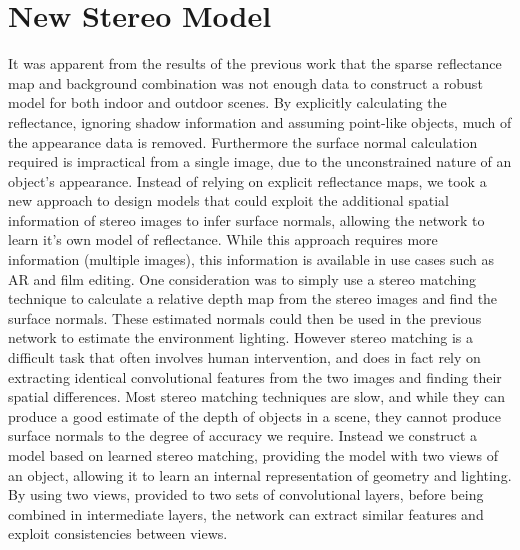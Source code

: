 \documentclass[ %
                    author={Gavin Parker},
                supervisor={Dr. Neill Campbell},
                    degree={MEng},
                     title={Deep Siamese Networks for Illumination Estimation from Stereo Images},
                  subtitle={},
                      type={research},
                      year={2018} ]{dissertation}
\begin{document}
\section{New Stereo Model}
It was apparent from the results of the previous work that the sparse reflectance map and background combination was not enough data to construct a robust model for both indoor and outdoor scenes. By explicitly calculating the reflectance, ignoring shadow information and assuming point-like objects, much of the appearance data is removed. Furthermore the surface normal calculation required is impractical from a single image, due to the unconstrained nature of an object's appearance. Instead of relying on explicit reflectance maps, we took a new approach to design models that could exploit the additional spatial information of stereo images to infer surface normals, allowing the network to learn it's own model of reflectance. While this approach requires more information (multiple images), this information is available in use cases such as AR and film editing. One consideration was to simply use a stereo matching technique to calculate a relative depth map from the stereo images and find the surface normals. These estimated normals could then be used in the previous network to estimate the environment lighting. However stereo matching is a difficult task that often involves human intervention, and does in fact rely on extracting identical convolutional features from the two images and finding their spatial differences. Most stereo matching techniques are slow, and while they can produce a good estimate of the depth of objects in a scene, they cannot produce surface normals to the degree of accuracy we require. Instead we construct a model based on learned stereo matching, providing the model with two views of an object, allowing it to learn an internal representation of geometry and lighting. By using two views, provided to two sets of convolutional layers, before being combined in intermediate layers, the network can extract similar features and exploit consistencies between views.
\end{document}
